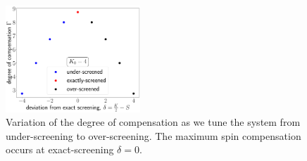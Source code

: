 \documentclass[reprint,prb,superscriptaddress]{revtex4-2}
\begin{document}
\begin{figure}[htpb]
	\centering
	\includegraphics[width=0.45\textwidth]{plt/deg_of_comp.pdf}
	\caption{Variation of the degree of compensation as we tune the system from under-screening to over-screening. The maximum spin compensation occurs at exact-screening \(\delta=0\).}
\end{figure}
\end{document}
